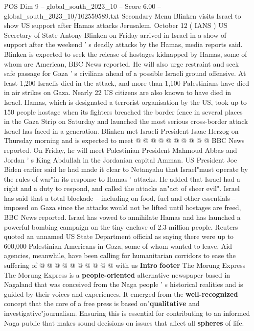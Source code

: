 \begin{textsample}{POS Dim 9 – global\_south\_2023\_10 – Score 6.00 – global\_south\_2023\_10/102559589.txt}  \label{ex:f9_pos_040}
Secondary Menu Blinken visits Israel to show US support after Hamas attacks Jerusalem, October 12 ( IANS ) US Secretary of State Antony Blinken on Friday arrived in Israel in a show of support after the weekend ' s deadly attacks by the Hamas, media reports said.
Blinken is expected to seek the release of hostages kidnapped by Hamas, some of whom are American, BBC News reported.
He will also urge restraint and seek safe passage for Gaza ' s civilians ahead of a possible Israeli ground offensive.
At least 1,200 Israelis died in the attack, and more than 1,100 Palestinians have died in air strikes on Gaza.
Nearly 22 US citizens are also known to have died in Israel.
Hamas, which is designated a terrorist organisation by the US, took up to 150 people hostage when its fighters breached the border fence in several places in the Gaza Strip on Saturday and launched the most serious cross-border attack Israel has faced in a generation.
Blinken met Israeli President Isaac Herzog on Thursday morning and is expected to meet @ @ @ @ @ @ @ @ @ @ BBC News reported.
On Friday, he will meet Palestinian President Mahmoud Abbas and Jordan ' s King Abdullah in the Jordanian capital Amman.
US President Joe Biden earlier said he had made it clear to Netanyahu that Israel"must operate by the rules of war"in its response to Hamas ' attacks.
He added that Israel had a right and a duty to respond, and called the attacks an"act of sheer evil".
Israel has said that a total blockade -- including on food, fuel and other essentials -- imposed on Gaza since the attacks would not be lifted until hostages are freed, BBC News reported.
Israel has vowed to annihilate Hamas and has launched a powerful bombing campaign on the tiny enclave of 2.3 million people.
Reuters quoted an unnamed US State Department official as saying there were up to 600,000 Palestinian Americans in Gaza, some of whom wanted to leave.
Aid agencies, meanwhile, have been calling for humanitarian corridors to ease the suffering of @ @ @ @ @ @ @ @ @ @ with us \textbf{Intro} \textbf{footer} The Morung Express The Morung Express is a \textbf{people-oriented} alternative newspaper based in Nagaland that was conceived from the Naga people ' s historical realities and is guided by their voices and experiences.
It emerged from the \textbf{well-recognized} concept that the core of a free press is based on"\textbf{qualitative} and investigative"journalism.
Ensuring this is essential for contributing to an informed Naga public that makes sound decisions on issues that affect all \textbf{spheres} of life.

\end{textsample}
